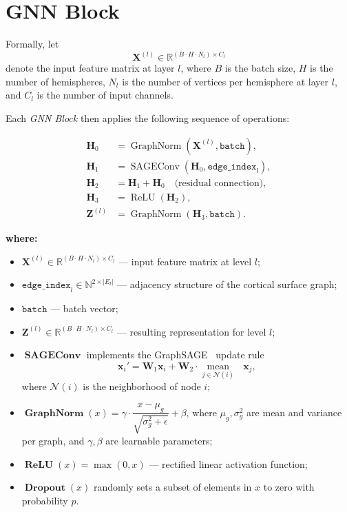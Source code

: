 \documentclass[FCD_GNN.tex]{subfiles}
\begin{document}
\section{GNN Block}

Formally, let 
\[
\mathbf{X}^{(l)} \in \mathbb{R}^{(B \cdot H \cdot N_l) \times C_l}
\]
denote the input feature matrix at layer $l$, where 
$B$ is the batch size, 
$H$ is the number of hemispheres, 
$N_l$ is the number of vertices per hemisphere at layer $l$, 
and $C_l$ is the number of input channels.  

Each \textit{GNN Block} then applies the following sequence of operations:

\begin{align}
    \mathbf{H}_0 &= \operatorname{GraphNorm}\!\left(\mathbf{X}^{(l)}, \texttt{batch}\right), \\[4pt]
    \mathbf{H}_1 &= \operatorname{SAGEConv}\!\left(\mathbf{H}_0, \texttt{edge\_index}_l\right), \\[4pt]
    \mathbf{H}_2 &= \mathbf{H}_1 + \mathbf{H}_0 \quad \text{(residual connection)}, \\[4pt]
    \mathbf{H}_3 &= \operatorname{ReLU}\!\left(\mathbf{H}_2\right), \\[4pt]
    \mathbf{Z}^{(l)} &= \operatorname{GraphNorm}\!\left(\mathbf{H}_3, \texttt{batch}\right).
\end{align}

\noindent\textbf{where:}
\begin{itemize}
    \item $\mathbf{X}^{(l)} \in \mathbb{R}^{(B \cdot H \cdot N_l)\times C_l}$ — input feature matrix at level $l$;
    \item $\texttt{edge\_index}_l \in \mathbb{N}^{2\times |E_l|}$ — adjacency structure of the cortical surface graph;
    \item $\texttt{batch}$ — batch vector;
    \item $\mathbf{Z}^{(l)} \in \mathbb{R}^{(B \cdot H \cdot N_l)\times C_l}$ — resulting representation for level $l$;
    \item $\operatorname{\textbf{SAGEConv}}$ implements the GraphSAGE~\cite{Hamilton2017GraphSAGE} update rule
    \[
    \mathbf{x}_i' = \mathbf{W}_1 \mathbf{x}_i + \mathbf{W}_2 \cdot \underset{j \in \mathcal{N}(i)}{\operatorname{mean}} \text{ } \mathbf{x}_j,
    \]
    where $\mathcal{N}(i)$ is the neighborhood of node $i$;
    \item $\operatorname{\textbf{GraphNorm}}(x) = \gamma \cdot \dfrac{x - \mu_g}{\sqrt{\sigma_g^2+\epsilon}} + \beta$, where $\mu_g, \sigma_g^2$ are mean and variance per graph, and $\gamma,\beta$ are learnable parameters;
    \item $\operatorname{\textbf{ReLU}}(x) = \max(0, x)$ — rectified linear activation function;
    \item $\operatorname{\textbf{Dropout}}(x)$ randomly sets a subset of elements in $x$ to zero with probability $p$.
\end{itemize}
\end{document}
